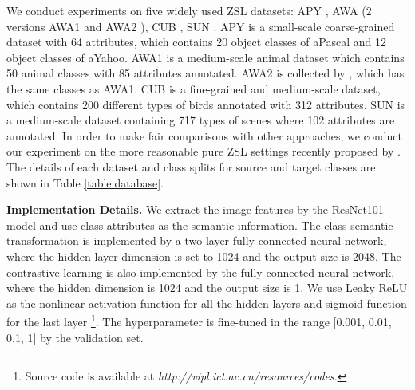 \documentclass[10pt,twocolumn,letterpaper]{article}
\begin{document}
We conduct experiments on five widely used ZSL datasets: APY \cite{farhadi2009describing}, AWA (2 versions AWA1 \cite{lampert2009learning} and AWA2 \cite{Xian2018ZeroShotL}), CUB \cite{wah2011caltech}, SUN \cite{patterson2014sun}. APY is a small-scale coarse-grained dataset with 64 attributes, which contains 20 object classes of aPascal and 12 object classes of aYahoo. AWA1 is a medium-scale animal dataset which contains 50 animal classes with 85 attributes annotated. AWA2 is collected by \cite{Xian2018ZeroShotL}, which has the same classes as AWA1. CUB is a fine-grained and medium-scale dataset, which contains 200 different types of birds annotated with 312 attributes. SUN is a medium-scale dataset containing 717 types of scenes where 102 attributes are annotated. In order to make fair comparisons with other approaches, we conduct our experiment on the more reasonable pure ZSL settings recently proposed by \cite{Xian2018ZeroShotL}. The details of each dataset and class splits for source and target classes are shown in Table \ref{table:database}.

\textbf{Implementation Details.} We extract the image features  by the ResNet101 model \cite{Kaiming2016} and use class attributes as the semantic information. The class semantic transformation  is implemented by a two-layer fully connected neural network, where the hidden layer dimension is set to 1024 and the output size is 2048. The contrastive learning  is also implemented by the fully connected neural network, where the hidden dimension is 1024 and the output size is 1. We use Leaky ReLU as the nonlinear activation function for all the hidden layers and sigmoid function for the last layer \footnote{Source code is available at \emph{http://vipl.ict.ac.cn/resources/codes}.}. The hyperparameter  is fine-tuned in the range [0.001, 0.01, 0.1, 1] by the validation set.
\end{document}
